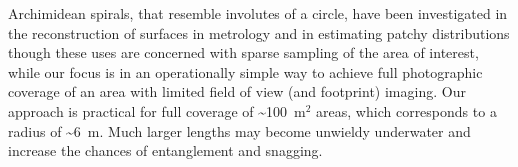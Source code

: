 Archimidean spirals, that resemble involutes of a circle, have been investigated in the reconstruction of surfaces in metrology \cite{Wieczorowski_2001} and in estimating patchy distributions \cite{Kalikhman_2006} though these uses are concerned with sparse sampling of the area of interest, while our focus is in an operationally simple way to achieve full photographic coverage of an area with limited field of view (and footprint) imaging. Our approach is practical for full coverage of \sim{100~m$^{2}$} areas, which corresponds to a radius of \sim{6~m}. Much larger lengths may become unwieldy underwater and increase the chances of entanglement and snagging.

  